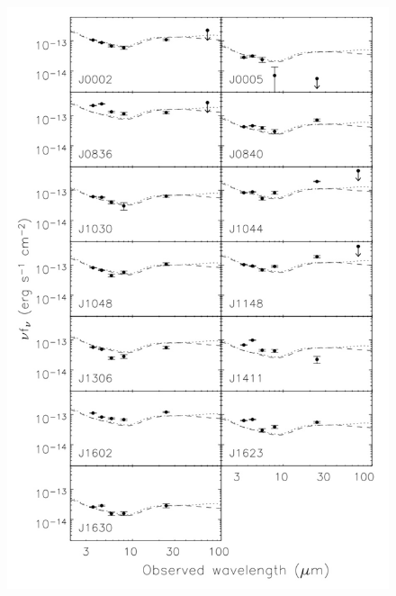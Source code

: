 \documentclass[11pt,a4paper]{article}
\begin{document}
\begin{figure}
\begin{multicols}{2}
    \end{multicols}
\begin{multicols}{2}
    \includegraphics[width=\linewidth]{Jiang_2006_AJ_132_2127_Fig2.jpeg}\par

\end{multicols}
\end{figure}
\end{document}
